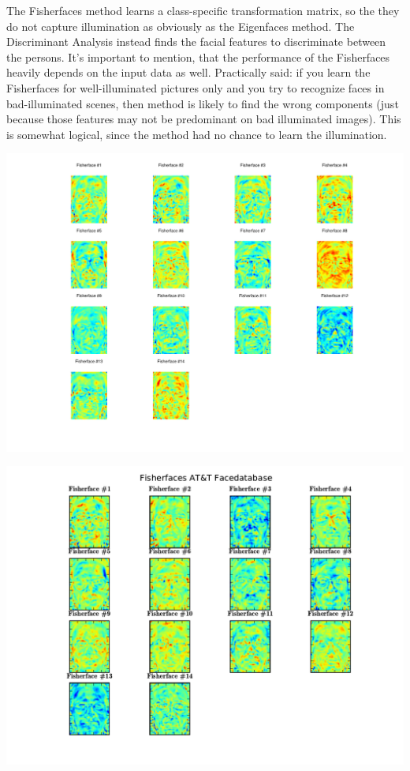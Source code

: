 The Fisherfaces method learns a class-specific transformation matrix, so the they do not capture illumination as obviously as the Eigenfaces method. The Discriminant Analysis instead finds the facial features to discriminate between the persons. It's important to mention, that the performance of the Fisherfaces heavily depends on the input data as well. Practically said: if you learn the Fisherfaces for well-illuminated pictures only and you try to recognize faces in bad-illuminated scenes, then method is likely to find the wrong components (just because those features may not be predominant on bad illuminated images). This is somewhat logical, since the method had no chance to learn the illumination.

\ifx\python\undefined
	\begin{center}
		\includegraphics[scale=0.6]{img/fisherfaces/octave_fisherfaces_fisherfaces}
	\end{center}
\else
	\begin{center}
		\includegraphics[scale=0.6]{img/fisherfaces/python_fisherfaces_fisherfaces}
	\end{center}
\fi

